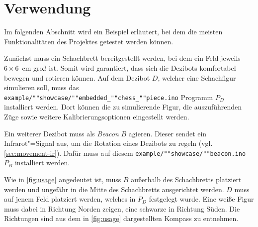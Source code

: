 
\section{Verwendung}

Im folgenden Abschnitt wird ein Beispiel erläutert, bei dem die meisten Funktionalitäten des Projektes getestet werden können.

Zunächst muss ein Schachbrett bereitgestellt werden, bei dem ein Feld jeweils \mbox{$6\times6$~cm} groß ist. Somit wird garantiert, dass sich die Dezibots komfortabel bewegen und rotieren können. Auf dem Dezibot $D$, welcher eine Schachfigur simulieren soll, muss das \texttt{example/""showcase/""embedded\_""chess\_""piece.ino} Programm $P_D$ installiert werden. Dort können die zu simulierende Figur, die auszuführenden Züge sowie weitere Kalibrierungsoptionen eingestellt werden.

Ein weiterer Dezibot muss als \emph{Beacon} $B$ agieren. Dieser sendet ein Infrarot"=Signal aus, um die Rotation eines Dezibots zu regeln (vgl. \autoref{sec:movement-ir}). Dafür muss auf diesem \texttt{example/""showcase/""beacon.ino} $P_B$ installiert werden.

Wie in \autoref{fig:usage} angedeutet ist, muss $B$ außerhalb des Schachbretts platziert werden und ungefähr in die Mitte des Schachbretts ausgerichtet werden. $D$ muss auf jenem Feld platziert werden, welches in $P_D$ festgelegt wurde. Eine weiße Figur muss dabei in Richtung Norden zeigen, eine schwarze in Richtung Süden. Die Richtungen sind aus dem in \autoref{fig:usage} dargestellten Kompass zu entnehmen.

